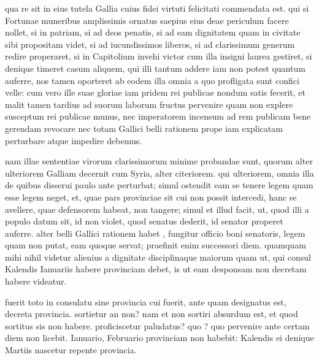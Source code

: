 qua re sit in eius tutela Gallia cuius fidei virtuti felicitati commendata est. qui si Fortunae muneribus amplissimis ornatus saepius eius deae periculum facere nollet, si in patriam, si ad deos penatis, si ad eam dignitatem quam in civitate sibi propositam videt, si ad iucundissimos liberos, si ad clarissimum generum redire properaret, si in Capitolium invehi victor cum illa insigni laurea gestiret, si denique timeret casum aliquem, qui illi tantum addere iam non potest quantum auferre, nos tamen oporteret ab eodem illa omnia a quo profligata sunt confici velle: cum vero ille suae gloriae iam pridem rei publicae nondum satis fecerit, et malit tamen tardius ad suorum laborum fructus pervenire quam non explere susceptum rei publicae munus, nec imperatorem incensum ad rem publicam bene gerendam revocare nec totam Gallici belli rationem prope iam explicatam perturbare atque impedire debemus.

 nam illae sententiae virorum clarissimorum minime probandae sunt, quorum alter ulteriorem Galliam decernit cum Syria, alter citeriorem. qui ulteriorem, omnia illa de quibus disserui paulo ante perturbat; simul ostendit eam se tenere legem quam esse legem neget, et, quae pars provinciae sit cui non possit intercedi, hanc se avellere, quae defensorem habeat, non tangere; simul et illud facit, ut, quod illi a populo datum sit, id non violet, quod senatus dederit, id senator properet auferre. alter belli Gallici rationem habet , fungitur officio boni senatoris, legem quam non putat, eam quoque servat; praefinit enim successori diem. quamquam mihi nihil videtur alienius a dignitate disciplinaque maiorum quam ut, qui consul Kalendis Ianuariis habere provinciam debet, is ut eam desponsam non decretam habere videatur.

 fuerit toto in consulatu sine provincia cui fuerit, ante quam designatus est, decreta provincia. sortietur an non? nam et non sortiri absurdum est, et quod sortitus sis non habere. proficiscetur paludatus? quo ? quo pervenire ante certam diem non licebit. Ianuario, Februario provinciam non habebit: Kalendis ei denique Martiis nascetur repente provincia.

